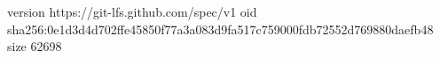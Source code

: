 version https://git-lfs.github.com/spec/v1
oid sha256:0e1d3d4d702ffe45850f77a3a083d9fa517c759000fdb72552d769880daefb48
size 62698
